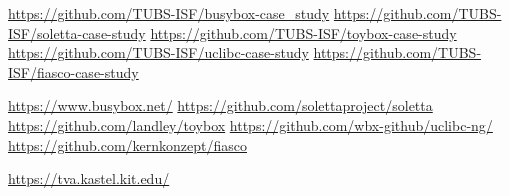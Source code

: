 
\urldef{\busyboxdata}\url{https://github.com/TUBS-ISF/busybox-case_study}
\urldef{\solettadata}\url{https://github.com/TUBS-ISF/soletta-case-study}
\urldef{\toyboxdata}\url{https://github.com/TUBS-ISF/toybox-case-study}
\urldef{\uclibcdata}\url{https://github.com/TUBS-ISF/uclibc-case-study}
\urldef{\fiascodata}\url{https://github.com/TUBS-ISF/fiasco-case-study}

\urldef{\busyboxLink}\url{https://www.busybox.net/}
\urldef{\solettaLink}\url{https://github.com/solettaproject/soletta}
\urldef{\toyboxLink}\url{https://github.com/landley/toybox}
\urldef{\uclibcLink}\url{https://github.com/wbx-github/uclibc-ng/}
\urldef{\fiascoLink}\url{https://github.com/kernkonzept/fiasco}

\urldef{\tva}\url{https://tva.kastel.kit.edu/}